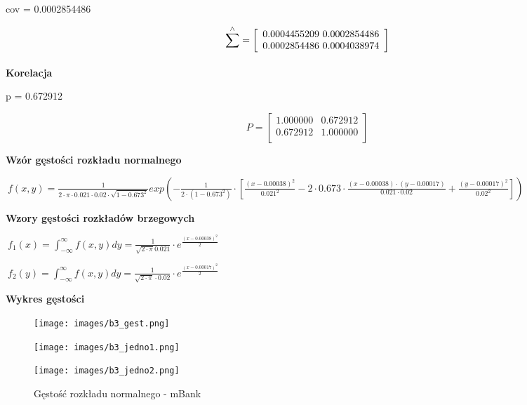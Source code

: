 \documentclass[12pt]{article}
\begin{document}
    cov = 0.0002854486
    
\[ \sum_{}^{\wedge} = \left[\begin{array}{c c }
    0.0004455209 \ 0.0002854486\\
    0.0002854486 \ 0.0004038974\\
     \end{array}\right]\]

\clearpage
{\bf \large Korelacja}

p = 0.672912

\[
P = \left[\begin{array}{cc}
    1.000000 & 0.672912\\
    0.672912 & 1.000000\\
\end{array}\right]
\]

\vspace{1 cm}
{\bf \large Wzór gęstości rozkładu normalnego}
\vspace{0.5 cm}

$\ f(x,y)= \frac{1}{2 \cdot \pi \cdot 0.021 \cdot 0.02 \cdot \sqrt{1-0.673^{2}}}
exp ( - \frac{1}{2\cdot(1-0.673^2)}\cdot [\frac{(x-0.00038)^{2}}{0.021^2}-2 \cdot 0.673 \cdot \frac{(x-0.00038) \cdot (y-0.00017)}{0.021 \cdot 0.02} + \frac{(y-0.00017)^{2}}{0.02^{2}}]) $

\vspace{1 cm}
{\bf \large Wzory gęstości rozkładów brzegowych}
\vspace{0.5 cm}

$\ f_{1}(x) = \int_{-\infty}^\infty f(x,y)dy = \frac{1}{\sqrt{2 \cdot \pi} 0.021} \cdot e ^{\frac{(x-0.00038)^{2}}{2}} $


$\ f_{2}(y) = \int_{-\infty}^\infty f(x,y)dy = \frac{1}{\sqrt{2 \cdot \pi} \cdot 0.02} \cdot e ^{\frac{(x-0.00017)^{2}}{2}} $

\clearpage
{\bf \large Wykres gęstości}

\begin{figure}[ht]
  \begin{minipage}[t]{\textwidth}
    \centering
    \texttt{[image: images/b3\_gest.png]}
    \caption{Wykres gęstości rozkładu łącznego}
  \end{minipage}

  \vspace{0.3 cm}  %

  \begin{minipage}[b]{0.48\textwidth}
    \centering
    \texttt{[image: images/b3\_jedno1.png]}
    \caption{Gęstość rozkładu normalnego - Bank Millennium}
  \end{minipage}
  \hfill
  \begin{minipage}[b]{0.48\textwidth}
    \centering
    \texttt{[image: images/b3\_jedno2.png]}
    \caption{Gęstość rozkładu normalnego - mBank}
  \end{minipage}
\end{figure}
\vspace{0.4 cm}
\end{document}
